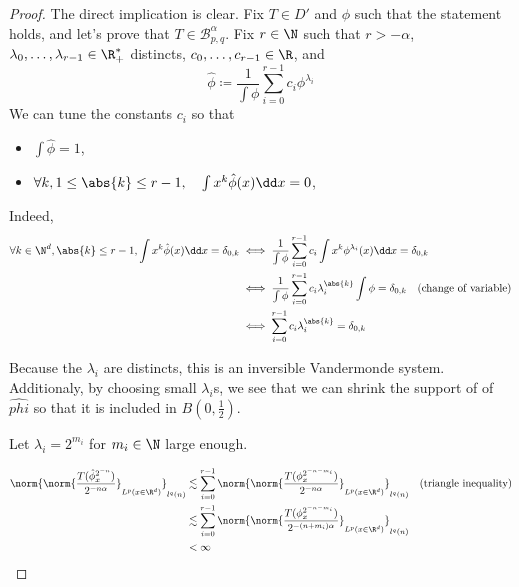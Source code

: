 \begin{proof}
    The direct implication is clear. 
    Fix $T \in D'$ and $\phi$ such that the statement holds, and let's prove that $T \in \mathcal{B}^\alpha_{p,q}$.
    Fix $r\in \N$ such that $r>-\alpha$, $\lambda_0, \dots,\lambda_{r-1} \in \R^*_+$ distincts, $c_0,\dots,c_{r-1} \in \R$, and
    \begin{equation*}
        \hat{\phi} \coloneq \frac{1}{\int \phi} \sum_{i=0}^{r-1} c_i \phi^{\lambda_i}
    \end{equation*}
    We can tune the constants $c_i$ so that 
    \begin{itemize}
        \item $\int \hat{\phi} = 1$,
        \item $\forall k, 1\leq \abs{k}\leq r-1, \quad \int x^k \hat{\phi}(x) \dd x = 0$, 
    \end{itemize}
    Indeed, 
    \begin{align*}
        \forall k \in \N^d, \abs{k}\leq r-1, \int x^k \hat{\phi}(x) \dd x = \delta_{0,k} &\iff \frac{1}{\int \phi} \sum_{i=0}^{r-1} c_i \int x^k \phi^{\lambda_i} (x) \dd x = \delta_{0,k} \\
        & \iff \frac{1}{\int \phi} \sum_{i=0}^{r-1} c_i \lambda_i^{\abs{k}} \int \phi = \delta_{0,k}  \quad \text{(change of variable)}\\
        & \iff \sum_{i=0}^{r-1} c_i \lambda_i^{\abs{k}} = \delta_{0,k}
    \end{align*}

    Because the $\lambda_i$ are distincts, this is an inversible Vandermonde system.
    Additionaly, by choosing small $\lambda_i$s, we see that we can shrink the support of of $\hat{phi}$ so that it is included in $B(0,\frac{1}{2})$.
    
    
    
    Let $\lambda_i = 2^{m_i}$ for $m_i\in \N$ large enough.
    
    \begin{align*}
        \norm{\norm{\frac{T(\hat{\phi}^{2^{-n}}_x)}{2^{-n\alpha}}}_{L^p(x\in \R^d)}}_{l^q(n)} &\lesssim \sum_{i=0}^{r-1} \norm{\norm{\frac{T(\phi^{2^{-n-m_i}}_x)}{2^{-n\alpha}}}_{L^p(x\in \R^d)}}_{l^q(n)} \quad \text{(triangle inequality)}\\
        &\lesssim \sum_{i=0}^{r-1} \norm{\norm{\frac{T(\phi^{2^{-n-m_i}}_x)}{2^{-(n+m_i)\alpha}}}_{L^p(x\in \R^d)}}_{l^q(n)} \\
        &<\infty
    \end{align*}


\end{proof}
